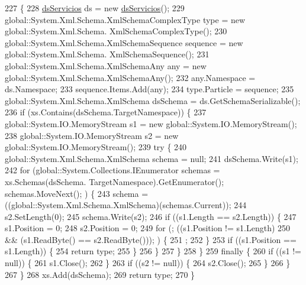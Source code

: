 \begin{DoxyCode}
227                                                                                                            
                             \{
228             \hyperlink{class_proyecto___integrador__3_1_1ds_servicios_a0734e62bba29ca7515ed72f2aee94662}{dsServicios} ds = \textcolor{keyword}{new} \hyperlink{class_proyecto___integrador__3_1_1ds_servicios_a0734e62bba29ca7515ed72f2aee94662}{dsServicios}();
229             global::System.Xml.Schema.XmlSchemaComplexType type = \textcolor{keyword}{new} global::System.Xml.Schema.
      XmlSchemaComplexType();
230             global::System.Xml.Schema.XmlSchemaSequence sequence = \textcolor{keyword}{new} global::System.Xml.Schema.
      XmlSchemaSequence();
231             global::System.Xml.Schema.XmlSchemaAny any = \textcolor{keyword}{new} global::System.Xml.Schema.XmlSchemaAny();
232             any.Namespace = ds.Namespace;
233             sequence.Items.Add(any);
234             type.Particle = sequence;
235             global::System.Xml.Schema.XmlSchema dsSchema = ds.GetSchemaSerializable();
236             \textcolor{keywordflow}{if} (xs.Contains(dsSchema.TargetNamespace)) \{
237                 global::System.IO.MemoryStream s1 = \textcolor{keyword}{new} global::System.IO.MemoryStream();
238                 global::System.IO.MemoryStream s2 = \textcolor{keyword}{new} global::System.IO.MemoryStream();
239                 \textcolor{keywordflow}{try} \{
240                     global::System.Xml.Schema.XmlSchema schema = null;
241                     dsSchema.Write(s1);
242                     \textcolor{keywordflow}{for} (global::System.Collections.IEnumerator schemas = xs.Schemas(dsSchema.
      TargetNamespace).GetEnumerator(); schemas.MoveNext(); ) \{
243                         schema = ((global::System.Xml.Schema.XmlSchema)(schemas.Current));
244                         s2.SetLength(0);
245                         schema.Write(s2);
246                         \textcolor{keywordflow}{if} ((s1.Length == s2.Length)) \{
247                             s1.Position = 0;
248                             s2.Position = 0;
249                             \textcolor{keywordflow}{for} (; ((s1.Position != s1.Length) 
250                                         && (s1.ReadByte() == s2.ReadByte())); ) \{
251                                 ;
252                             \}
253                             \textcolor{keywordflow}{if} ((s1.Position == s1.Length)) \{
254                                 \textcolor{keywordflow}{return} type;
255                             \}
256                         \}
257                     \}
258                 \}
259                 \textcolor{keywordflow}{finally} \{
260                     \textcolor{keywordflow}{if} ((s1 != null)) \{
261                         s1.Close();
262                     \}
263                     \textcolor{keywordflow}{if} ((s2 != null)) \{
264                         s2.Close();
265                     \}
266                 \}
267             \}
268             xs.Add(dsSchema);
269             \textcolor{keywordflow}{return} type;
270         \}
\end{DoxyCode}
